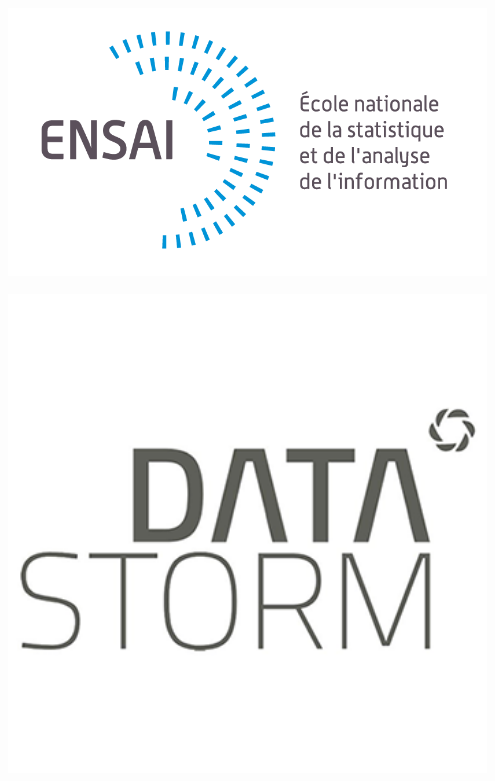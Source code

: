 \textsc{{\LARGE \entitytitle}} \\ %
\vspace{5mm}
\begin{minipage}{0.49\textwidth}
    \centering
    \includegraphics[width=0.95\textwidth]{Images/ensai_logo.png}\\[1.0 cm] %
\end{minipage}
\begin{minipage}{0.49\textwidth}
    \centering
    \includegraphics[width=0.95\textwidth]{Images/datastom_logo.png}\\[1.0 cm] %
\end{minipage}
